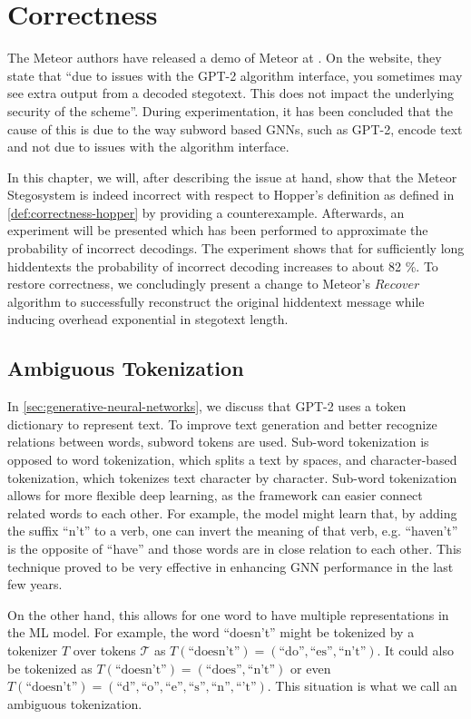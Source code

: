 \chapter{Correctness}
\label{chap:correctness}

The Meteor authors have released a demo of Meteor at \cite{MeteorDemo2021}. On the website, they state that ``due to issues with the GPT-2 algorithm interface, you sometimes may see extra output from a decoded stegotext. This does not impact the underlying security of the scheme''.
During experimentation,  it has been concluded that the cause of this is due to the way subword based GNNs, such as GPT-2, encode text and not due to issues with the algorithm interface.

In this chapter, we will, after describing the issue at hand, show that the Meteor Stegosystem is indeed incorrect with respect to Hopper's definition as defined in \autoref{def:correctness-hopper} by providing a counterexample.
Afterwards, an experiment will be presented which has been performed to approximate the probability of incorrect decodings.
The experiment shows that for sufficiently long hiddentexts the probability of incorrect decoding increases to about 82 \%.
To restore correctness, we concludingly present a change to Meteor's $Recover$ algorithm to successfully reconstruct the original hiddentext message while inducing overhead exponential in stegotext length.

\section{Ambiguous Tokenization}

In \autoref{sec:generative-neural-networks}, we discuss that GPT-2 uses a token dictionary to represent text.
To improve text generation and better recognize relations between words, subword tokens are used.
Sub-word tokenization is opposed to word tokenization, which splits a text by spaces, and character-based tokenization, which tokenizes text character by character.
Sub-word tokenization allows for more flexible deep learning, as the framework can easier connect related words to each other. 
For example, the model might learn that, by adding the suffix ``n't'' to a verb, one can invert the meaning of that verb, e.g. ``haven't'' is the opposite of ``have'' and those words are in close relation to each other.
This technique proved to be very effective in enhancing GNN performance in the last few years.

On the other hand, this allows for one word to have multiple representations in the ML model.
For example, the word ``doesn't'' might be tokenized by a tokenizer $T$ over tokens $\mathcal{T}$ as $T(\textrm{``doesn't''}) = ( \textrm{``do''}, \textrm{``es''}, \textrm{``n't''} )$.
It could also be tokenized as $T(\textrm{``doesn't''}) = ( \textrm{``does''}, \textrm{``n't''} )$ or even $T(\textrm{``doesn't''}) = ( \textrm{``d''}, \textrm{``o''}, \textrm{``e''}, \textrm{``s''}, \textrm{``n''}, \textrm{``'t''})$.
This situation is what we call an ambiguous tokenization.

